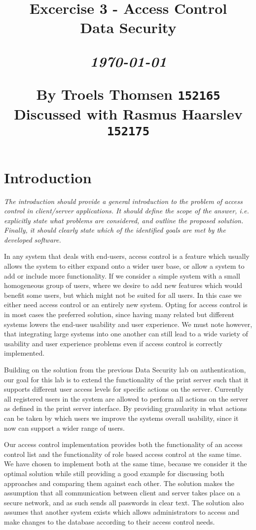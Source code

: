\documentclass[12pt]{article}
\title{
  \vspace{4cm}
  \begin{flushleft}
  \Large{\textbf{Excercise 3 - Access Control}} \\
  \large{Data Security} \\
  \end{flushleft}
  \vspace{0cm}
  \begin{flushleft}
  \small
  \textit{\today}
  \end{flushleft}
  \vspace{12cm}
  \begin{flushleft}
  \small
  By Troels Thomsen \texttt{152165}\\
  Discussed with Rasmus Haarslev \texttt{152175}
  \end{flushleft}
}
\date{
}
\begin{document}
\clearpage
{}
\thispagestyle{empty}
\maketitle

\newpage

\tableofcontents

\newpage


\section{Introduction}
\label{sec:Introduction}

\textit{The introduction should provide a general introduction to the problem of access control in client/server applications. It should define the scope of the answer, i.e. explicitly state what problems are considered, and outline the proposed solution. Finally, it should clearly state which of the identified goals are met by the developed software.}

In any system that deals with end-users, access control is a feature which usually allows the system to either expand onto a wider user base, or allow a system to add or include more functionality. If we consider a  simple system with a small homogeneous group of users, where we desire to add new features which would benefit some users, but which might not be suited for all users. In this case we either need access control or an entirely new system. Opting for access control is in most cases the preferred solution, since having many related but different systems lowers the end-user usability and user experience. We must note however, that integrating large systems into one another can still lead to a wide variety of usability and user experience problems even if access control is correctly implemented.

Building on the solution from the previous Data Security lab on authentication, our goal for this lab is to extend the functionality of the print server such that it supports different user access levels for specific actions on the server. Currently all registered users in the system are allowed to perform all actions on the server as defined in the print server interface. By providing granularity in what actions can be taken by which users we improve the systems overall usability, since it now can support a wider range of users.

Our access control implementation provides both the functionality of an access control list and the functionality of role based access control at the same time. We have chosen to implement both at the same time, because we consider it the optimal solution while still providing a good example for discussing both approaches and comparing them against each other. The solution makes the assumption that all communication between client and server takes place on a secure network, and as such sends all passwords in clear text. The solution also assumes that another system exists which allows administrators to access and make changes to the database according to their access control needs.
\end{document}
